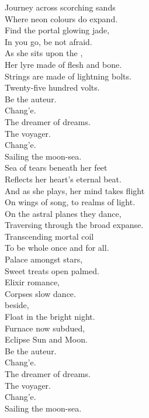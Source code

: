 Journey across scorching sands \\
Where neon colours do expand. \\
Find the portal glowing jade, \\
In you go, be not afraid. \\
As she sits upon the , \\
Her lyre made of flesh and bone. \\
Strings are made of lightning bolts. \\
Twenty-five hundred volts. \\

Be the auteur. \\
Chang'e. \\
The dreamer of dreams. \\
The voyager. \\
Chang'e. \\
Sailing the moon-sea. \\

Sea of tears beneath her feet \\
Reflects her heart's eternal beat. \\
And as she plays, her mind takes flight \\
On wings of song, to realms of light. \\
On the astral planes they dance, \\
Traversing through the broad expanse. \\
Transcending mortal coil \\
To be whole once and for all. \\

Palace amongst stars, \\
Sweet treats open palmed. \\
Elixir romance, \\
Corpses slow dance. \\
 beside, \\
Float in the bright night. \\
Furnace now subdued, \\
Eclipse Sun and Moon. \\

Be the auteur. \\
Chang'e. \\
The dreamer of dreams. \\
The voyager. \\
Chang'e. \\
Sailing the moon-sea. \\

